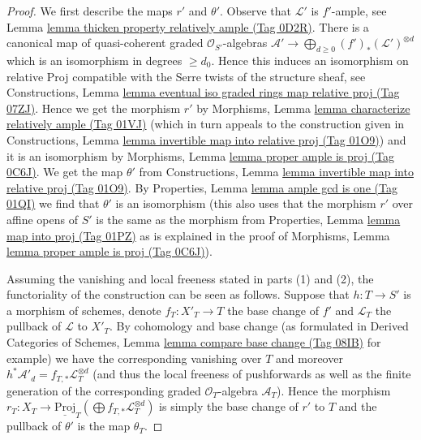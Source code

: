 \documentclass{amsart}
\theoremstyle{plain}
\theoremstyle{definition}
\theoremstyle{remark}
\numberwithin{equation}{subsection}
\begin{document}
\begin{proof}
We first describe the maps $r'$ and $\theta'$.
Observe that $\mathcal{L}'$ is $f'$-ample, see
Lemma \href{https://stacks.math.columbia.edu/tag/0D2R}{lemma thicken property relatively ample (Tag 0D2R)}.
There is a canonical map of quasi-coherent graded
$\mathcal{O}_{S'}$-algebras
$\mathcal{A}' \to \bigoplus_{d \geq 0} (f')_*(\mathcal{L}')^{\otimes d}$
which is an isomorphism in degrees $\geq d_0$.
Hence this induces an isomorphism on relative Proj
compatible with the Serre twists of the structure sheaf, see
Constructions, Lemma
\href{https://stacks.math.columbia.edu/tag/07ZJ}{lemma eventual iso graded rings map relative proj (Tag 07ZJ)}.
Hence we get the morphism $r'$ by
Morphisms, Lemma \href{https://stacks.math.columbia.edu/tag/01VJ}{lemma characterize relatively ample (Tag 01VJ)}
(which in turn appeals to the construction given in
Constructions, Lemma
\href{https://stacks.math.columbia.edu/tag/01O9}{lemma invertible map into relative proj (Tag 01O9)})
and it is an isomorphism by
Morphisms, Lemma \href{https://stacks.math.columbia.edu/tag/0C6J}{lemma proper ample is proj (Tag 0C6J)}.
We get the map $\theta'$ from Constructions, Lemma
\href{https://stacks.math.columbia.edu/tag/01O9}{lemma invertible map into relative proj (Tag 01O9)}.
By Properties, Lemma \href{https://stacks.math.columbia.edu/tag/01QI}{lemma ample gcd is one (Tag 01QI)}
we find that $\theta'$ is an isomorphism
(this also uses that the morphism $r'$ over affine
opens of $S'$ is the same as the morphism from
Properties, Lemma \href{https://stacks.math.columbia.edu/tag/01PZ}{lemma map into proj (Tag 01PZ)}
as is explained in the proof
of Morphisms, Lemma \href{https://stacks.math.columbia.edu/tag/0C6J}{lemma proper ample is proj (Tag 0C6J)}).

\medskip\noindent
Assuming the vanishing and local freeness stated in parts
(1) and (2), the functoriality of the construction can be seen as follows.
Suppose that $h : T \to S'$ is a morphism of schemes, denote
$f_T : X'_T \to T$ the base change of $f'$ and
$\mathcal{L}_T$ the pullback of $\mathcal{L}$ to $X'_T$.
By cohomology and base change
(as formulated in Derived Categories of Schemes,
Lemma \href{https://stacks.math.columbia.edu/tag/08IB}{lemma compare base change (Tag 08IB)} for example)
we have the corresponding vanishing over $T$ and moreover
$h^*\mathcal{A}'_d = f_{T, *}\mathcal{L}_T^{\otimes d}$
(and thus the local freeness of pushforwards as well
as the finite generation of the corresponding graded
$\mathcal{O}_T$-algebra $\mathcal{A}_T$).
Hence the morphism
$r_T : X_T \to
\underline{\text{Proj}}_T(\bigoplus f_{T, *}\mathcal{L}_T^{\otimes d})$
is simply the base change of $r'$ to $T$ and the pullback of
$\theta'$ is the map $\theta_T$.


\end{proof}
\end{document}
